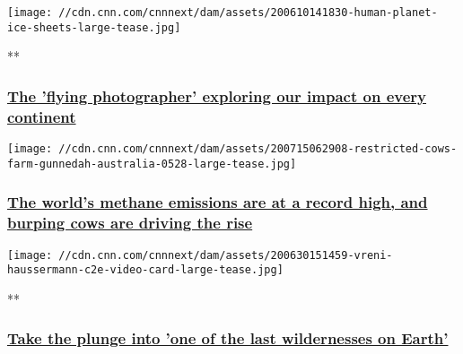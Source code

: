 \href{/style/gallery/human-planet-george-steinmetz-spc-intl/index.html}{}

\texttt{[image: //cdn.cnn.com/cnnnext/dam/assets/200610141830-human-planet-ice-sheets-large-tease.jpg]}

**

\hypertarget{the-flying-photographer-exploring-our-impact-on-every-continent}{%
\subsubsection{\texorpdfstring{\href{/style/gallery/human-planet-george-steinmetz-spc-intl/index.html}{The
'flying photographer' exploring our impact on every
continent}}{The 'flying photographer' exploring our impact on every continent}}\label{the-flying-photographer-exploring-our-impact-on-every-continent}}

\href{/2020/07/15/world/methane-emissions-record-scli-intl-scn/index.html}{}

\texttt{[image: //cdn.cnn.com/cnnnext/dam/assets/200715062908-restricted-cows-farm-gunnedah-australia-0528-large-tease.jpg]}

\hypertarget{the-worlds-methane-emissions-are-at-a-record-high-and-burping-cows-are-driving-the-rise}{%
\subsubsection{\texorpdfstring{\href{/2020/07/15/world/methane-emissions-record-scli-intl-scn/index.html}{The
world's methane emissions are at a record high, and burping cows are
driving the
rise}}{The world's methane emissions are at a record high, and burping cows are driving the rise}}\label{the-worlds-methane-emissions-are-at-a-record-high-and-burping-cows-are-driving-the-rise}}

\href{/videos/tv/2020/06/30/vreni-haussermann-c2e-spc-int.cnn}{}

\texttt{[image: //cdn.cnn.com/cnnnext/dam/assets/200630151459-vreni-haussermann-c2e-video-card-large-tease.jpg]}

**

\hypertarget{take-the-plunge-into-one-of-the-last-wildernesses-on-earth}{%
\subsubsection{\texorpdfstring{\href{/videos/tv/2020/06/30/vreni-haussermann-c2e-spc-int.cnn}{Take
the plunge into 'one of the last wildernesses on
Earth'}}{Take the plunge into 'one of the last wildernesses on Earth'}}\label{take-the-plunge-into-one-of-the-last-wildernesses-on-earth}}

